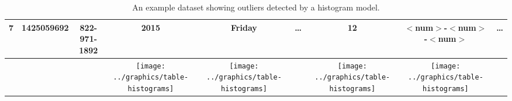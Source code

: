 \begin{table*}[t]
\begin{center}
\begin{tabular}{|c|c|c||c|c|c||c|c|c|}
7 & 1425059692 & 822-971-1892 & 2015 & Friday &\ldots& 12 & $<$num$>$-$<$num$>$-$<$num$>$ &  \ldots\\ \hline
\multicolumn{3}{c}{} & \multicolumn{1}{c}{\texttt{[image: ../graphics/table-histograms]}} &\multicolumn{1}{c}{ \texttt{[image: ../graphics/table-histograms]}} &\multicolumn{1}{c}{}&\multicolumn{1}{c}{ \texttt{[image: ../graphics/table-histograms]} }& \multicolumn{1}{c}{ \texttt{[image: ../graphics/table-histograms]}} & \multicolumn{1}{c}{}
\end{tabular}
\end{center}

\caption{An example dataset showing outliers detected by a histogram model.}
\label{tab:example}
\end{table*}
